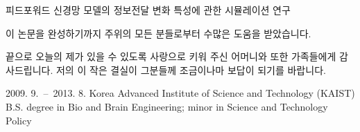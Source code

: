 \documentclass[master,english,final]{kaist-ucs}
\begin{document}



\begin{summary}

    피드포워드 신경망 모델의 정보전달 변화 특성에 관한 시뮬레이션 연구

\end{summary}


\acknowledgement[english]

    
    이 논문을 완성하기까지 주위의 모든 분들로부터 수많은 도움을 받았습니다.

    끝으로 오늘의 제가 있을 수 있도록 사랑으로 키워 주신
    어머니와 또한 가족들에게 감사드립니다.
    저의 이 작은 결실이 그분들께 조금이나마 보답이 되기를 바랍니다.

\curriculumvitae[english]

    \begin{personaldata}
        \address    {30/1 Moo.6 Phayakhan, Muang Phatthalung, Phatthalung, Thailand 93000}
    \end{personaldata}

    \begin{education}
        \item[2009. 9.\ --\ 2013. 8.] Korea Advanced Institute of Science and Technology (KAIST) \newline
        B.S. degree in Bio and Brain Engineering; minor in Science and Technology Policy \\	
    \end{education}
\end{document}

